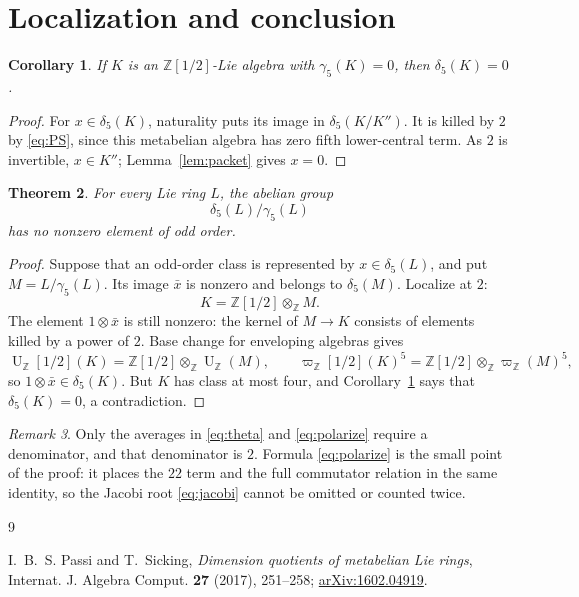 \documentclass[10pt,a4paper]{amsart}
\newtheorem{theorem}{Theorem}[section]
\newtheorem{corollary}[theorem]{Corollary}
\theoremstyle{remark}
\newtheorem{remark}[theorem]{Remark}
\newcommand{\Z}{\mathbb Z}
\newcommand{\R}{\mathbb Z[1/2]}
\newcommand{\U}{\operatorname U}
\newcommand{\aug}{\varpi}
\begin{document}
\section{Localization and conclusion}

\begin{corollary}\label{cor:class4}
If $K$ is an $\R$-Lie algebra with $\gamma_5(K)=0$, then
$\delta_5(K)=0$.
\end{corollary}

\begin{proof}
For $x\in\delta_5(K)$, naturality puts its image in
$\delta_5(K/K'')$.  It is killed by $2$ by \eqref{eq:PS}, since this
metabelian algebra has zero fifth lower-central term.
As $2$ is invertible, $x\in K''$; Lemma~\ref{lem:packet} gives $x=0$.
\end{proof}

\begin{theorem}
For every Lie ring $L$, the abelian group
\[
                         \delta_5(L)/\gamma_5(L)
\]
has no nonzero element of odd order.
\end{theorem}

\begin{proof}
Suppose that an odd-order class is represented by $x\in\delta_5(L)$,
and put $M=L/\gamma_5(L)$.  Its image $\bar x$ is nonzero and belongs
to $\delta_5(M)$.  Localize at $2$:
\[
                            K=\R\otimes_\Z M.
\]
The element $1\otimes\bar x$ is still nonzero: the kernel of
$M\to K$ consists of elements killed by a power of $2$.  Base change
for enveloping algebras gives
\[
 \U_\R(K)=\R\otimes_\Z\U_\Z(M),\qquad
 \aug_\R(K)^5=\R\otimes_\Z\aug_\Z(M)^5,
\]
so $1\otimes\bar x\in\delta_5(K)$.  But $K$ has class at most four,
and Corollary~\ref{cor:class4} says that $\delta_5(K)=0$, a
contradiction.
\end{proof}

\begin{remark}
Only the averages in \eqref{eq:theta} and \eqref{eq:polarize} require
a denominator, and that denominator is $2$.  Formula
\eqref{eq:polarize} is the small point of the proof: it
places the $22$ term and the full commutator relation in the same
identity, so the Jacobi root \eqref{eq:jacobi} cannot be omitted or
counted twice.
\end{remark}

\begin{thebibliography}{9}

I.~B.~S. Passi and T.~Sicking,
\emph{Dimension quotients of metabelian Lie rings},
Internat. J. Algebra Comput. \textbf{27} (2017), 251--258;
\href{https://arxiv.org/abs/1602.04919}{arXiv:1602.04919}.

\end{thebibliography}
\end{document}

